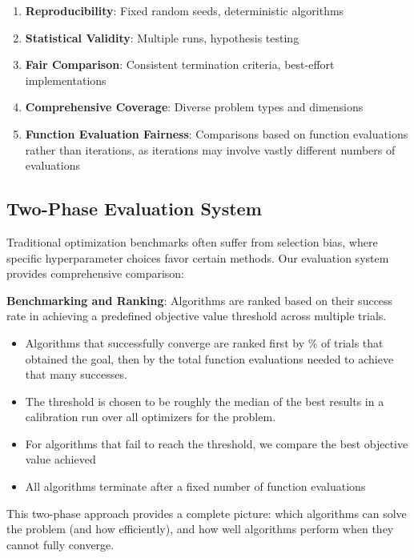 \begin{enumerate}
\def\labelenumi{\arabic{enumi}.}
\tightlist
\item
  \textbf{Reproducibility}: Fixed random seeds, deterministic algorithms
\item
  \textbf{Statistical Validity}: Multiple runs, hypothesis testing
\item
  \textbf{Fair Comparison}: Consistent termination criteria, best-effort implementations
\item
  \textbf{Comprehensive Coverage}: Diverse problem types and dimensions
\item
  \textbf{Function Evaluation Fairness}: Comparisons based on function evaluations rather than iterations, as iterations may involve vastly different numbers of evaluations
\end{enumerate}

\hypertarget{two-phase-evaluation-system}{%
\subsection{Two-Phase Evaluation System}\label{two-phase-evaluation-system}}

Traditional optimization benchmarks often suffer from selection bias, where specific hyperparameter choices favor certain methods. Our evaluation system provides comprehensive comparison:

\textbf{Benchmarking and Ranking}: Algorithms are ranked based on their success rate in achieving a predefined objective value threshold across multiple trials.

\begin{itemize}
\tightlist
\item
  Algorithms that successfully converge are ranked first by \% of trials that obtained the goal, then by the total function evaluations needed to achieve that many successes.
\item
  The threshold is chosen to be roughly the median of the best results in a calibration run over all optimizers for the problem.
\item
  For algorithms that fail to reach the threshold, we compare the best objective value achieved
\item
  All algorithms terminate after a fixed number of function evaluations
\end{itemize}

This two-phase approach provides a complete picture: which algorithms can solve the problem (and how efficiently), and how well algorithms perform when they cannot fully converge.

